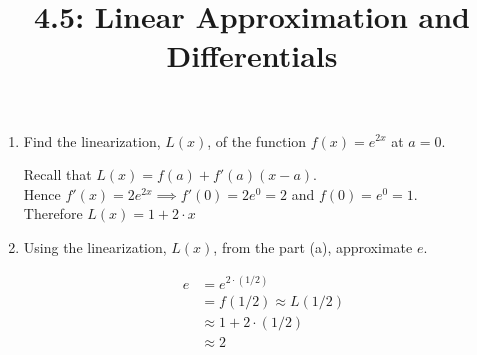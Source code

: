 \documentclass[nooutcomes,handout]{ximera}
\title{4.5: Linear Approximation and Differentials}
\begin{document}
\begin{abstract}
\end{abstract}
\maketitle

\begin{problem}


  \begin{enumerate}
    \item
      Find the linearization, $L(x)$, of the function $f(x) = e^{2x}$ at $a = 0$.
      \begin{freeResponse}
        Recall that $L(x) = f(a) + f'(a)(x - a)$.\\
        Hence  $f'(x) = 2e^{2x} \implies f'(0) = 2e^{0} = 2$  and $ f(0) = e^{0} = 1$.\\
        Therefore $L(x) = 1 + 2\cdot x$
      \end{freeResponse}

    \item
    Using the linearization, $L(x)$, from the part (a), approximate $e$.
      \begin{freeResponse}
        \begin{align*}
          e &= e^{2\cdot(1/2)}\\
          &= f(1/2) \approx L(1/2)\\
          &\approx 1 + 2\cdot(1/2)\\
          &\approx 2
        \end{align*}
      \end{freeResponse}

  \end{enumerate}
\end{problem}
\end{document}
